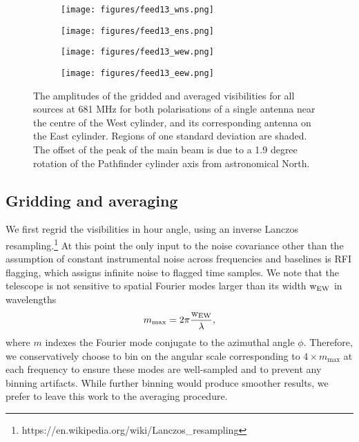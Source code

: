 \begin{figure}[h!] %
	\centering
	\begin{subfigure}[b]{0.49\textwidth}%
		\texttt{[image: figures/feed13\_wns.png]}%
	\end{subfigure}%
	\begin{subfigure}[b]{0.47\textwidth}
		\texttt{[image: figures/feed13\_ens.png]}%
	\end{subfigure}
	\begin{subfigure}[b]{0.4925\textwidth}
		\texttt{[image: figures/feed13\_wew.png]}%
	\end{subfigure}
	\begin{subfigure}[b]{0.4675\textwidth}
		\texttt{[image: figures/feed13\_eew.png]}%
	\end{subfigure}
\caption{The amplitudes of the gridded and averaged visibilities for all sources at 681 MHz for both polarisations of a single antenna near the centre of the West cylinder, and its corresponding antenna on the East cylinder. Regions of one standard deviation are shaded. The offset of the peak of the main beam is due to a 1.9 degree rotation of the Pathfinder cylinder axis from astronomical North.}
\vspace{-.1in}
\label{griddeddata}
\end{figure}

\subsection{Gridding and averaging}
We first regrid the visibilities in hour angle, using an inverse Lanczos resampling.\footnote{https://en.wikipedia.org/wiki/Lanczos\_resampling} At this point the only input to the noise covariance other than the assumption of constant instrumental noise across frequencies and baselines is RFI flagging, which assigns infinite noise to flagged time samples. We note that the telescope is not sensitive to spatial Fourier modes larger than its width ${\rm w_{EW}}$ in wavelengths
\begin{equation}
m_{\rm max} = 2\pi \frac{\rm w_{EW}}{\lambda},
\end{equation}
where $m$ indexes the Fourier mode conjugate to the azimuthal angle $\phi$. Therefore, we conservatively choose to bin on the angular scale corresponding to $4\times m_{\max}$ at each frequency to ensure these modes are well-sampled and to prevent any binning artifacts. While further binning would produce smoother results, we prefer to leave this work to the averaging procedure. 

